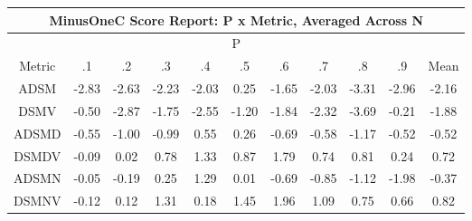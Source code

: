 \documentclass[11pt,a4paper]{report}
\begin{document}
\begin{longtable}{ | c || c | c | c | c | c | c | c | c | c || c |}
\hline
\multicolumn{11}{|c|}{ MinusOneC Score Report: P x Metric, Averaged Across N } \\
\hline
\multicolumn{11}{|c|}{ P } \\
\hline
Metric & .1 & .2 & .3 & .4 & .5 & .6 & .7 & .8 & .9 & Mean\\
\hline
\hline
\endhead
ADSM &  \cellcolor[HTML]{FFB7B7} -2.83 &  \cellcolor[HTML]{FFBFBF} -2.63 &  \cellcolor[HTML]{FFC7C7} -2.23 &  \cellcolor[HTML]{FFCFCF} -2.03 &  \cellcolor[HTML]{F7F7FF} 0.25 &  \cellcolor[HTML]{FFD7D7} -1.65 &  \cellcolor[HTML]{FFCFCF} -2.03 &  \cellcolor[HTML]{FFAFAF} -3.31 &  \cellcolor[HTML]{FFB7B7} -2.96 &  \cellcolor[HTML]{FFC7C7} -2.16 \\
DSMV &  \cellcolor[HTML]{FFEFEF} -0.50 &  \cellcolor[HTML]{FFB7B7} -2.87 &  \cellcolor[HTML]{FFCFCF} -1.75 &  \cellcolor[HTML]{FFBFBF} -2.55 &  \cellcolor[HTML]{FFDFDF} -1.20 &  \cellcolor[HTML]{FFCFCF} -1.84 &  \cellcolor[HTML]{FFC7C7} -2.32 &  \cellcolor[HTML]{FF9F9F} -3.69 &  \cellcolor[HTML]{FFF7F7} -0.21 &  \cellcolor[HTML]{FFCFCF} -1.88 \\
ADSMD &  \cellcolor[HTML]{FFEFEF} -0.55 &  \cellcolor[HTML]{FFE7E7} -1.00 &  \cellcolor[HTML]{FFE7E7} -0.99 &  \cellcolor[HTML]{EFEFFF} 0.55 &  \cellcolor[HTML]{F7F7FF} 0.26 &  \cellcolor[HTML]{FFEFEF} -0.69 &  \cellcolor[HTML]{FFEFEF} -0.58 &  \cellcolor[HTML]{FFDFDF} -1.17 &  \cellcolor[HTML]{FFEFEF} -0.52 &  \cellcolor[HTML]{FFEFEF} -0.52 \\
DSMDV &  \cellcolor[HTML]{FFFFFF} -0.09 &  \cellcolor[HTML]{FFFFFF} 0.02 &  \cellcolor[HTML]{EFEFFF} 0.78 &  \cellcolor[HTML]{DFDFFF} 1.33 &  \cellcolor[HTML]{E7E7FF} 0.87 &  \cellcolor[HTML]{CFCFFF} 1.79 &  \cellcolor[HTML]{EFEFFF} 0.74 &  \cellcolor[HTML]{E7E7FF} 0.81 &  \cellcolor[HTML]{F7F7FF} 0.24 &  \cellcolor[HTML]{EFEFFF} 0.72 \\
ADSMN &  \cellcolor[HTML]{FFFFFF} -0.05 &  \cellcolor[HTML]{FFF7F7} -0.19 &  \cellcolor[HTML]{F7F7FF} 0.25 &  \cellcolor[HTML]{DFDFFF} 1.29 &  \cellcolor[HTML]{FFFFFF} 0.01 &  \cellcolor[HTML]{FFEFEF} -0.69 &  \cellcolor[HTML]{FFE7E7} -0.85 &  \cellcolor[HTML]{FFDFDF} -1.12 &  \cellcolor[HTML]{FFCFCF} -1.98 &  \cellcolor[HTML]{FFF7F7} -0.37 \\
DSMNV &  \cellcolor[HTML]{FFFFFF} -0.12 &  \cellcolor[HTML]{FFFFFF} 0.12 &  \cellcolor[HTML]{DFDFFF} 1.31 &  \cellcolor[HTML]{F7F7FF} 0.18 &  \cellcolor[HTML]{D7D7FF} 1.45 &  \cellcolor[HTML]{CFCFFF} 1.96 &  \cellcolor[HTML]{E7E7FF} 1.09 &  \cellcolor[HTML]{EFEFFF} 0.75 &  \cellcolor[HTML]{EFEFFF} 0.66 &  \cellcolor[HTML]{E7E7FF} 0.82 \\

\end{longtable}
\end{document}
